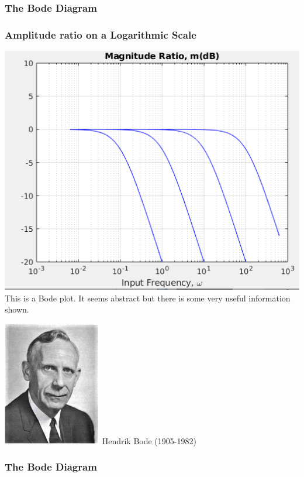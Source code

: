 \documentclass[fleqn]{beamer} %
\newcommand{\sectionIIsubsectionIIItitle}{The Bode Diagram}
\begin{document}
			\begin{frame}
				\frametitle{\sectionIIsubsectionIIItitle}
				\bigskip

				\frametitle{Amplitude ratio on a Logarithmic Scale}
				\begin{multicols}{2}

				\includegraphics[scale=.30]{images/lecture2_fig7.png}
				This is a Bode plot. It seems abstract but there is some very useful information shown.\vspc

				  \includegraphics[scale=.4]{images/hendrikbode.png} \vspc Hendrik Bode (1905-1982) 

				\end{multicols}
								
				\btVFill 
			\end{frame}

			\begin{frame}
				\frametitle{\sectionIIsubsectionIIItitle}
				\bigskip

				
				\btVFill 
			\end{frame}
\end{document}
